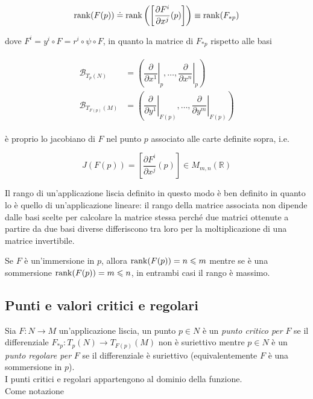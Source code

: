 \begin{equation}
	\rank(F(p)) \doteq \rank\left( \left[ \dfrac{\partial F^{i}}{\partial x^{j}} (p) \right] \right) \equiv \rank(F_{*p})
\end{equation}

dove $ F^{i} = y^{i} \circ F = r^{i} \circ \psi \circ F $, in quanto la matrice di $ F_{*p} $ rispetto alle basi

\begin{align}
	\begin{split}
		\mathcal{B}_{T_{p}(N)} &= \left( \left. \dfrac{\partial}{\partial x^{1}} \right|_{p} , \dots , \left. \dfrac{\partial}{\partial x^{n}} \right|_{p} \right)\\
		\mathcal{B}_{T_{F(p)}(M)} &= \left( \left. \dfrac{\partial}{\partial y^{1}} \right|_{F(p)} , \dots , \left. \dfrac{\partial}{\partial y^{m}} \right|_{F(p)} \right)
	\end{split}
\end{align}

è proprio lo jacobiano di $ F $ nel punto $ p $ associato alle carte definite sopra, i.e.

\begin{equation}
	J(F(p)) = \left[ \dfrac{\partial F^{i}}{\partial x^{j}} (p) \right] \in M_{m,n}(\mathbb{R})
\end{equation}

Il rango di un'applicazione liscia definito in questo modo è ben definito in quanto lo è quello di un'applicazione lineare: il rango della matrice associata non dipende dalle basi scelte per calcolare la matrice stessa perché due matrici ottenute a partire da due basi diverse differiscono tra loro per la moltiplicazione di una matrice invertibile.

\begin{remark}
	Se $ F $ è un'immersione in $ p $, allora $ \rank(F(p)) = n \leqslant m $ mentre se è una sommersione $ \rank(F(p)) = m \leqslant n $, in entrambi casi il rango è massimo.
\end{remark}

\subsection{Punti e valori critici e regolari}

Sia $ F : N \to M $ un'applicazione liscia, un punto $ p \in N $ è un \textit{punto critico per} $ F $ se il differenziale $ F_{*p} : T_{p}(N) \to T_{F(p)}(M) $ non è suriettivo mentre $ p \in N $ è un \textit{punto regolare per} $ F $ se il differenziale è suriettivo (equivalentemente $ F $ è una sommersione in $ p $).\\
I punti critici e regolari appartengono al dominio della funzione.\\
Come notazione

